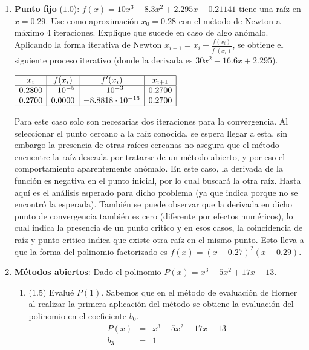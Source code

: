 \documentclass[12pt]{article}
\begin{document}
  \begin{enumerate}[leftmargin=*,widest=9]
    \item \textbf{Punto fijo} ($1.0$): \(f(x) = 10x^3 - 8.3x^2 + 2.295x - 0.21141\) tiene una raíz en \(x=0.29\). Use como aproximación \(x_0=0.28\) con el método de Newton a máximo 4 iteraciones. Explique que sucede en caso de algo anómalo.
    Aplicando la forma iterativa de Newton \(x_{i+1} = x_i - \frac{f(x_i)}{f^\prime (x_i)} \), se obtiene el siguiente proceso iterativo (donde la derivada es \(30x^2 - 16.6x + 2.295 \)).
    \begin{center}
       \(
    \begin{array}{|c|c|c|c|}
    \hline
    x_i & f(x_i) & f^\prime (x_i) & x_{i+1} \\
    \hline
    0.2800 & -10^{-5} & -10^{-3} & 0.2700\\
    0.2700 & 0.0000 & -8.8818\cdot 10^{-16} & 0.2700\\
    \hline
    \end{array}
    \) 
    \end{center}
Para este caso solo son necesarias dos iteraciones para la convergencia. Al seleccionar el punto cercano a la raíz conocida, se espera llegar a esta, sin embargo la presencia de otras raíces cercanas no asegura que el método encuentre la raíz deseada por tratarse de un método abierto, y por eso el comportamiento aparentemente anómalo. En este caso, la derivada de la función es negativa en el punto inicial, por lo cual buscará la otra raíz. Hasta aquí es el análisis esperado para dicho problema (ya que indica porque no se encontró la esperada).
También se puede observar que la derivada en dicho punto de convergencia también es cero (diferente por efectos numéricos), lo cual indica la presencia de un punto critico y en esos casos, la coincidencia de raíz y punto critico indica que existe otra raíz en el mismo punto. Esto lleva a que la forma del polinomio factorizado es \(f(x) = (x-0.27)^2(x-0.29)\).
    \item \textbf{Métodos abiertos}: Dado el polinomio \(P(x) = x^3 - 5x^2 + 17x -13\). 
    \begin{enumerate}[label=\alph*]
    \item ($1.5$) Evalué \(P(1)\).
    Sabemos que en el método de evaluación de Horner al realizar la primera aplicación del método se obtiene la evaluación del polinomio en el coeficiente \(b_0\).
\begin{eqnarray*}
P(x) & = & x^3 - 5x^2 + 17x -13\\
b_3 & = & 1 \\

\end{eqnarray*}
\end{enumerate}
\end{enumerate}
\end{document}
